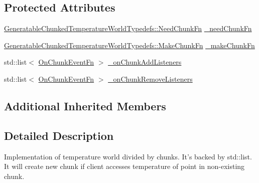 \subsection*{Protected Attributes}
\begin{DoxyCompactItemize}
\item 
\hyperlink{namespace_generatable_chunked_temperature_world_typedefs_a07d38658571f8f09839bc1bc8b105107}{Generatable\-Chunked\-Temperature\-World\-Typedefs\-::\-Need\-Chunk\-Fn} \hyperlink{class_generatable_chunked_temperature_world_a9159830777efdcfab20bd6f1e84eda42}{\-\_\-need\-Chunk\-Fn}
\item 
\hyperlink{namespace_generatable_chunked_temperature_world_typedefs_a719e4469a105a21a76ed22274639c03a}{Generatable\-Chunked\-Temperature\-World\-Typedefs\-::\-Make\-Chunk\-Fn} \hyperlink{class_generatable_chunked_temperature_world_ad1573a4224ea6bbe88843ed82f26e107}{\-\_\-make\-Chunk\-Fn}
\item 
std\-::list$<$ \hyperlink{class_i_temperature_world_chunkable_observable_mixin_a777c50f4a4ca0b3f7cd6bc02b87bb883}{On\-Chunk\-Event\-Fn} $>$ \hyperlink{class_generatable_chunked_temperature_world_a4d8bd2602e4563b1f347e967bc1d3f23}{\-\_\-on\-Chunk\-Add\-Listeners}
\item 
std\-::list$<$ \hyperlink{class_i_temperature_world_chunkable_observable_mixin_a777c50f4a4ca0b3f7cd6bc02b87bb883}{On\-Chunk\-Event\-Fn} $>$ \hyperlink{class_generatable_chunked_temperature_world_a4f5ce92a800ce903982033724d025e09}{\-\_\-on\-Chunk\-Remove\-Listeners}
\end{DoxyCompactItemize}
\subsection*{Additional Inherited Members}


\subsection{Detailed Description}
Implementation of temperature world divided by chunks. It's backed by {\ttfamily std\-::list}. It will create new chunk if client accesses temperature of point in non-\/existing chunk. 

